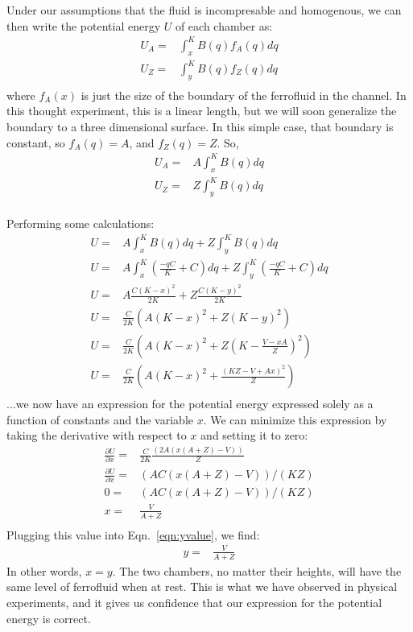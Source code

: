 \documentclass{asme2ej}
\begin{document}
Under our assumptions that the fluid is incompresable and homogenous,
we can then write the potential energy $U$ of each chamber as:
\begin{align}
  U_A = &\int_x^K B(q) f_A(q) dq \\
  U_Z = & \int_y^K B(q) f_Z(q) dq \\
\end{align}
where $f_A(x)$ is just the size of the boundary of the ferrofluid in the channel.
In this thought experiment, this is a linear length, but we will soon generalize the boundary to a three dimensional surface.
In this simple case, that boundary is constant, so $f_A(q) = A$, and
$f_Z(q) = Z$.
So,
\begin{align}
  U_A = & A \int_x^K B(q) dq \\
  U_Z = & Z \int_y^K B(q) dq \\
\end{align}

Performing some calculations:
\begin{align}
  U = &A \int_x^K B(q) dq + Z \int_y^K B(q) dq \\
  U = &A \int_x^K (\frac{-qC}{K} + C) dq + Z \int_y^K (\frac{-qC}{K} + C) dq \\
  U = &A \frac{C (K - x)^2}{2 K} + Z \frac{C (K - y)^2}{2 K} \\
  U = & \frac{C}{2K} \left( A  (K - x)^2 + Z (K - y)^2 \right) \\
  U = & \frac{C}{2K} \left( A  (K - x)^2 + Z (K - \frac{V - xA}{Z})^2 \right) \\
  U = & \frac{C}{2K} \left( A  (K - x)^2 + \frac{(K Z - V + A x)^2}{Z} \right) \\
\end{align}
...we now have an expression for the potential energy expressed solely as a function of constants
and the variable $x$. We can minimize this expression by taking the derivative with respect
to $x$ and setting it to zero:
\begin{align}
  \frac{\partial U}{\partial x} = & \frac{C}{2K} \frac{(2 A (x (A + Z) - V))}{Z} \\
  \frac{\partial U}{\partial x} = & (A C (x (A + Z) - V))/(K Z) \\
  0 = &  (A C (x (A + Z) - V))/(K Z)\\
  x = & \frac{V}{A + Z} \\
\end{align}
Plugging this value into Eqn.~\ref{eqn:yvalue}, we find:
\begin{align}
  y = & \frac{V}{A + Z}
\end{align}
In other words, $x = y$. The two chambers, no matter their heights, will have
the same level of ferrofluid when at rest. This is what we have observed in
physical experiments, and it gives us confidence that our expression for the
potential energy is correct.
\end{document}
